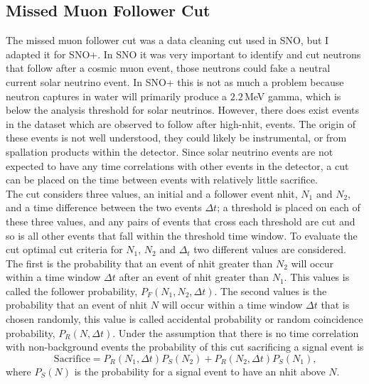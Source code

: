 \begin{appendices}
\section{Missed Muon Follower Cut}
The missed muon follower cut was a data cleaning cut used in SNO, but I adapted
it for SNO+.
In SNO it was very important to identify and cut neutrons that follow
after a cosmic muon event, those neutrons could fake
a neutral current solar neutrino event.
In SNO+ this is not as much a problem because neutron captures in water will
primarily produce a $2.2$\,MeV gamma, which is below the analysis threshold for
solar neutrinos.
However, there does exist events in the dataset which are observed to follow
after high-nhit, events. The origin of these events is not well understood, they
could likely be instrumental, or from  spallation products within the detector.
Since solar neutrino events are not expected to have any time correlations
with other events in the detector, a cut can be placed on the time between
events with relatively little sacrifice.\\

The cut considers three values, an initial and a follower event nhit, $N_{1}$
and $N_{2}$, and a time difference between the two events $\Delta t$;
a threshold is placed on each of these three values, and any pairs of events that cross
each threshold are cut and so is all other events that fall within the threshold
time window.
To evaluate the cut optimal cut criteria for $N_{1}$, $N_{2}$ and $\Delta_{t}$
two different values are considered.
The first is the probability that an event of nhit greater than $N_{2}$ will occur within a time
window $\Delta t$ after an event of nhit greater than $N_{1}$.
This values is called the follower probability, $P_{F}(N_{1}, N_{2}, \Delta t)$.
The second values is the probability that an event of nhit $N$ will occur
within a time window $\Delta t$ that is chosen randomly, this value
is called accidental probability or random coincidence probability, $P_{R}(N, \Delta t)$.
Under the assumption that there is no time correlation with non-background
events the probability of this cut sacrificing a signal event is
\begin{equation}
    \mathrm{Sacrifice} = P_{R}(N_{1},\Delta t)P_{S}(N_{2}) + P_{R}(N_{2}, \Delta t)P_{S}(N_{1})\text{,}
\end{equation}
where $P_{S}(N)$ is the probability for a signal event to have an nhit above
$N$.


\end{appendices}
